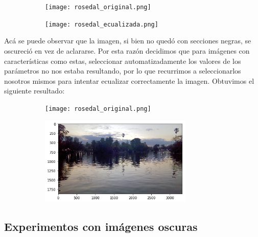 \documentclass[10pt, a4paper]{article}
\begin{document}
\begin{figure}[H]	
	\centering
    \begin{subfigure}{0.5\textwidth}
	\centering
        \texttt{[image: rosedal\_original.png]}
    \end{subfigure}\hfill
    \begin{subfigure}{0.5\textwidth}
    	\centering
        \texttt{[image: rosedal\_ecualizada.png]}
    \end{subfigure}\hfill	
\end{figure}

Acá se puede observar que la imagen, si bien no quedó con secciones negras, se oscureció en vez de aclararse.  Por esta razón decidimos que para imágenes con características como estas, seleccionar automatizadamente los valores de los parámetros no nos estaba resultando, por lo que recurrimos a seleccionarlos nosotros mismos para intentar ecualizar correctamente la imagen. Obtuvimos el siguiente resultado:

\begin{figure}[H]	
	\centering
    \begin{subfigure}{0.5\textwidth}
	\centering
        \texttt{[image: rosedal\_original.png]}
    \end{subfigure}\hfill
    \begin{subfigure}{0.5\textwidth}
    	\centering
        \includegraphics[width=0.8\textwidth]{rosedal-101-010.png}
    \end{subfigure}\hfill	
\end{figure}

\subsection{Experimentos con imágenes oscuras}
\end{document}
